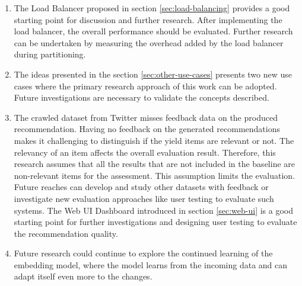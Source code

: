 \begin{enumerate}
    \item The Load Balancer proposed in section \ref{sec:load-balancing} provides a good starting point for discussion and further research. After implementing the load balancer, the overall performance should be evaluated. Further research can be undertaken by measuring the overhead added by the load balancer during partitioning.
    
    \item The ideas presented in the section \ref{sec:other-use-cases} presents two new use cases where the primary research approach of this work can be adopted. Future investigations are necessary to validate the concepts described.
    
    \item The crawled dataset from Twitter misses feedback data on the produced recommendation. Having no feedback on the generated recommendations makes it challenging to distinguish if the yield items are relevant or not. The relevancy of an item affects the overall evaluation result. Therefore, this research assumes that all the results that are not included in the baseline are non-relevant items for the assessment. This assumption limits the evaluation. Future reaches can develop and study other datasets with feedback or investigate new evaluation approaches like user testing to evaluate such systems. The Web UI Dashboard introduced in section \ref{sec:web-ui} is a good starting point for further investigations and designing user testing to evaluate the recommendation quality.
    
    \item Future research could continue to explore the continued learning of the embedding model, where the model learns from the incoming data and can adapt itself even more to the changes. 
\end{enumerate}